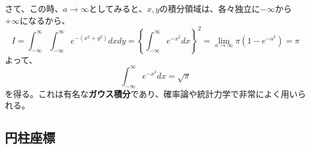 \documentclass[a4j,dvipdfmx]{jsarticle}
\begin{document}
さて、この時、$a\to\infty$としてみると、$x,y$の積分領域は、各々独立に$-\infty$から$+\infty$になるから、
\begin{equation*}
    I=\int_{-\infty}^{\infty}\int_{-\infty}^{\infty} e^{-(x^2+y^2)}dxdy=\left\{\int_{-\infty}^{\infty}e^{-x^2}dx\right\}^2
    =\lim_{a\to\infty}\pi(1-e^{-a^2})=\pi
\end{equation*}
よって、
\begin{equation}
    \int_{-\infty}^{\infty}e^{-x^2}dx=\sqrt{\pi}\label{6.21}
\end{equation}
を得る。これは有名な\textbf{ガウス積分}であり、確率論や統計力学で非常によく用いられる。

\subsection{円柱座標}
\end{document}
